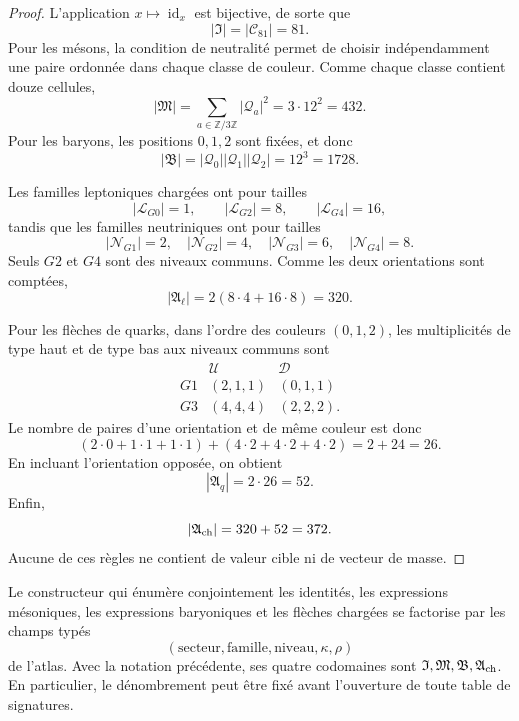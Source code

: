 \begin{proof}
L’application \(x\mapsto\operatorname{id}_x\) est bijective, de sorte que
\[
 |\mathfrak I|=|\mathcal C_{81}|=81.
\]
Pour les mésons, la condition de neutralité permet de choisir indépendamment une paire ordonnée dans chaque classe de couleur. Comme chaque classe contient douze cellules,
\[
 |\mathfrak M|
 =\sum_{a\in\mathbb Z/3\mathbb Z}|\mathcal Q_a|^2
 =3\cdot12^2
 =432.
\]
Pour les baryons, les positions \(0,1,2\) sont fixées, et donc
\[
 |\mathfrak B|
 =|\mathcal Q_0||\mathcal Q_1||\mathcal Q_2|
 =12^3
 =1728.
\]

Les familles leptoniques chargées ont pour tailles
\[
 |\mathcal L_{G0}|=1,\qquad
 |\mathcal L_{G2}|=8,\qquad
 |\mathcal L_{G4}|=16,
\]
tandis que les familles neutriniques ont pour tailles
\[
 |\mathcal N_{G1}|=2,\quad
 |\mathcal N_{G2}|=4,\quad
 |\mathcal N_{G3}|=6,\quad
 |\mathcal N_{G4}|=8.
\]
Seuls \(G2\) et \(G4\) sont des niveaux communs. Comme les deux orientations sont comptées,
\[
 |\mathfrak A_\ell|
 =2(8\cdot4+16\cdot8)
 =320.
\]

Pour les flèches de quarks, dans l’ordre des couleurs \((0,1,2)\), les multiplicités de type haut et de type bas aux niveaux communs sont
\[
\begin{array}{ccc}
 &\mathcal U&\mathcal D\\
 G1&(2,1,1)&(0,1,1)\\
 G3&(4,4,4)&(2,2,2).
\end{array}
\]
Le nombre de paires d’une orientation et de même couleur est donc
\[
 (2\cdot0+1\cdot1+1\cdot1)
 +(4\cdot2+4\cdot2+4\cdot2)
 =2+24=26.
\]
En incluant l’orientation opposée, on obtient
\[
 |\mathfrak A_q|=2\cdot26=52.
\]
Enfin,
\[
 |\mathfrak A_{\rm ch}|=320+52=372.
\]
Aucune de ces règles ne contient de valeur cible ni de vecteur de masse.
\end{proof}

\begin{corollary}
\label{cor:constructor-composicional-sin-blancos} Le constructeur qui énumère conjointement les identités, les expressions mésoniques, les expressions baryoniques et les flèches chargées se factorise par les champs typés
\[
 (\text{secteur},\text{famille},\text{niveau},\kappa,\rho)
\]
de l’atlas. Avec la notation précédente, ses quatre codomaines sont \(\mathfrak I,\mathfrak M,\mathfrak B,\mathfrak A_{\rm ch}\). En particulier, le dénombrement peut être fixé avant l’ouverture de toute table de signatures.
\end{corollary}

